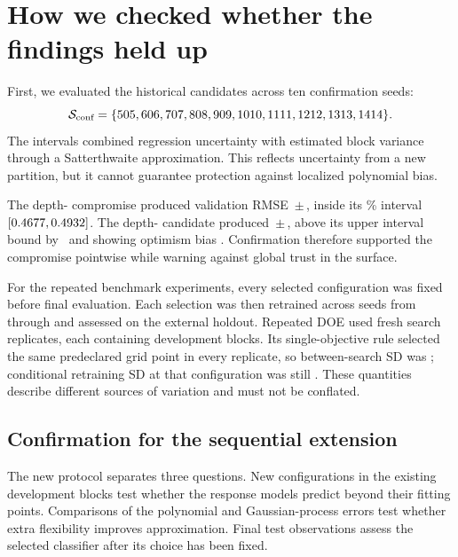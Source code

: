 \documentclass[12pt,a4paper]{article}
\begin{document}
\section{How we checked whether the findings held up}
First, we evaluated the historical candidates across ten confirmation seeds:
\[
\mathcal{S}_{\text{conf}}=\{505, 606, 707, 808, 909, 1010, 1111, 1212, 1313, 1414\}.
\]
The intervals combined regression uncertainty with estimated block variance through a Satterthwaite approximation. This reflects uncertainty from a new partition, but it cannot guarantee protection against localized polynomial bias.
\begin{table}[tbp]
\centering
\small
\setlength{\tabcolsep}{3.2pt}

\caption{Independent confirmation of the historical multi-objective compromise and accuracy-focused boundary candidate. The compromise confirmed within its interval; the boundary candidate exposed polynomial optimism.}
\label{tab:confirmation}
\end{table}

The depth-\numPubDepthMo{} compromise produced validation RMSE \numConfEmpValRMSE\,$\pm$\,\numConfEmpValRMSEStd, inside its \numPubCoveragePct\% interval $[0.4677,0.4932]$. The depth-\numPubDepthSo{} candidate produced \numConfSoEmpValRMSE\,$\pm$\,\numConfSoEmpValRMSEStd, above its upper interval bound by \numConfSoExceedance\ and showing optimism bias \numConfSoBias. Confirmation therefore supported the compromise pointwise while warning against global trust in the surface.

For the repeated benchmark experiments, every selected configuration was fixed before final evaluation. Each selection was then retrained across \numPubEvalSeeds{} seeds from \numPubFirstEvalSeed{} through \numPubLastEvalSeed{} and assessed on the external holdout. Repeated DOE used \numPubSearchReplicates{} fresh search replicates, each containing \numPubRepeatedBlocks{} development blocks. Its single-objective rule selected the same predeclared grid point in every replicate, so between-search SD was \numRevDoeSoTestRMSESd; conditional retraining SD at that configuration was still \numRevDoeSoRetrainSd. These quantities describe different sources of variation and must not be conflated.

\subsection{Confirmation for the sequential extension}
The new protocol separates three questions. New configurations in the existing development blocks test whether the response models predict beyond their fitting points. Comparisons of the polynomial and Gaussian-process errors test whether extra flexibility improves approximation. Final test observations assess the selected classifier after its choice has been fixed.
\end{document}
